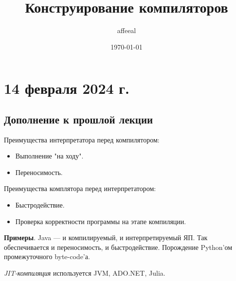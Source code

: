 \documentclass{article}
\title{Конструирование компиляторов}
\author{affeeal}
\date{\today}
\begin{document}
\maketitle

\pagebreak

\tableofcontents

\pagebreak

\section{14 февраля 2024 г.}

\subsection{Дополнение к прошлой лекции}

Преимущества интерпретатора перед компилятором:

\begin{itemize}
  \item Выполнение "на ходу".
  \item Переносимость.
\end{itemize}

Преимущества комплятора перед интерпретатором:

\begin{itemize}
  \item Быстродействие.
  \item Проверка корректности программы на этапе компиляции.
\end{itemize}

\textbf{Примеры}. Java --- и компилируемый, и интерпретируемый ЯП. Так
обеспечивается и переносимость, и быстродействие. Порождение Python'ом
промежуточного byte-code'а.

\textit{JIT-компиляция} используется JVM, ADO.NET, Julia.
\end{document}

